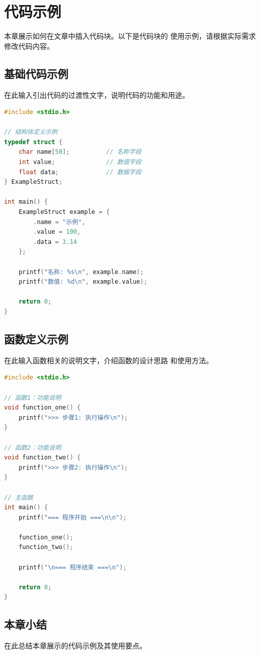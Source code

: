 
\section{代码示例}

本章展示如何在文章中插入代码块。以下是代码块的
使用示例，请根据实际需求修改代码内容。

\subsection{基础代码示例}

在此输入引出代码的过渡性文字，说明代码的功能和用途。

\begin{lstlisting}[language=C, caption={结构体定义示例}, label={lst:struct_example}]
#include <stdio.h>

// 结构体定义示例
typedef struct {
    char name[50];          // 名称字段
    int value;              // 数值字段
    float data;             // 数据字段
} ExampleStruct;

int main() {
    ExampleStruct example = {
        .name = "示例",
        .value = 100,
        .data = 3.14
    };
    
    printf("名称: %s\n", example.name);
    printf("数值: %d\n", example.value);
    
    return 0;
}
\end{lstlisting}

\subsection{函数定义示例}

在此输入函数相关的说明文字，介绍函数的设计思路
和使用方法。

\begin{lstlisting}[language=C, caption={函数示例代码}, label={lst:function_example}]
#include <stdio.h>

// 函数1：功能说明
void function_one() {
    printf(">>> 步骤1: 执行操作\n");
}

// 函数2：功能说明
void function_two() {
    printf(">>> 步骤2: 执行操作\n");
}

// 主函数
int main() {
    printf("=== 程序开始 ===\n\n");
    
    function_one();
    function_two();
    
    printf("\n=== 程序结束 ===\n");
    
    return 0;
}
\end{lstlisting}

\subsection{本章小结}

在此总结本章展示的代码示例及其使用要点。
